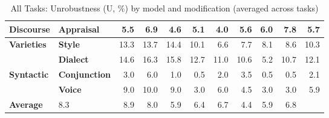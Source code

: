 \begin{table}[h]
{\begin{tabular}{llrrrrrrrrr}
\midrule
\textbf{Discourse} & \textbf{Appraisal} & \cellcolor{blue!14} 5.5 & \cellcolor{blue!18} 6.9 & \cellcolor{blue!12} 4.6 & \cellcolor{blue!13} 5.1 & \cellcolor{blue!10} 4.0 & \cellcolor{blue!15} 5.6 & \cellcolor{blue!16} 6.0 & \cellcolor{blue!20} 7.8 & \cellcolor{blue!15} 5.7 \\ 
\midrule
\textbf{Varieties} & \textbf{Style} & \cellcolor{blue!34} 13.3 & \cellcolor{blue!35} 13.7 & \cellcolor{blue!37} 14.4 & \cellcolor{blue!26} 10.1 & \cellcolor{blue!17} 6.6 & \cellcolor{blue!20} 7.7 & \cellcolor{blue!21} 8.1 & \cellcolor{blue!22} 8.6 & \cellcolor{blue!27} 10.3 \\ 
  & \textbf{Dialect} & \cellcolor{blue!38} 14.6 & \cellcolor{blue!42} 16.3 & \cellcolor{blue!41} 15.8 & \cellcolor{blue!33} 12.7 & \cellcolor{blue!28} 11.0 & \cellcolor{blue!27} 10.6 & \cellcolor{blue!13} 5.2 & \cellcolor{blue!28} 10.7 & \cellcolor{blue!31} 12.1 \\ 
\midrule
\textbf{Syntactic} & \textbf{Conjunction} & \cellcolor{blue!8} 3.0 & \cellcolor{blue!15} 6.0 & \cellcolor{blue!3} 1.0 & \cellcolor{blue!1} 0.5 & \cellcolor{blue!5} 2.0 & \cellcolor{blue!9} 3.5 & \cellcolor{blue!1} 0.5 & \cellcolor{blue!1} 0.5 & \cellcolor{blue!5} 2.1 \\ 
  & \textbf{Voice} & \cellcolor{blue!23} 9.0 & \cellcolor{blue!26} 10.0 & \cellcolor{blue!23} 9.0 & \cellcolor{blue!8} 3.0 & \cellcolor{blue!15} 6.0 & \cellcolor{blue!12} 4.5 & \cellcolor{blue!8} 3.0 & \cellcolor{blue!8} 3.0 & \cellcolor{blue!15} 5.9 \\ 
\midrule
\textbf{Average} &  \cellcolor{blue!21} 8.3 & \cellcolor{blue!23} 8.9 & \cellcolor{blue!21} 8.0 & \cellcolor{blue!15} 5.9 & \cellcolor{blue!16} 6.4 & \cellcolor{blue!17} 6.7 & \cellcolor{blue!11} 4.4 & \cellcolor{blue!15} 5.9 & \cellcolor{blue!18} 6.8 \\ 
\bottomrule
\end{tabular}}
\caption{All Tasks: Unrobustness (U, \%) by model and modification (averaged across tasks)}\label{tab:all_tasks_unrob}
\end{table}